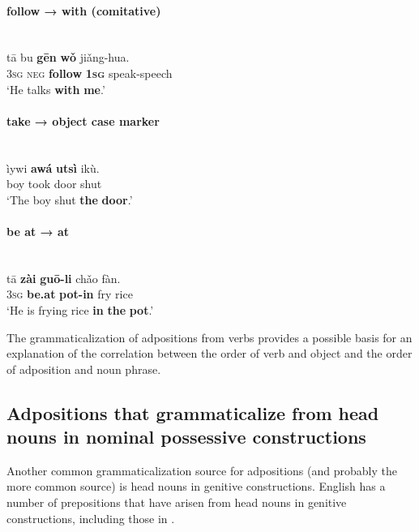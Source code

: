 \documentclass[output=paper]{langsci/langscibook}
\begin{document}
\paragraph*{follow → with (comitative)}

\ea\label{ex:dryer:5}
\\
\gll   tā  bu  \textbf{gēn}  \textbf{wǒ}  jiǎng-hua.\\
       3\textsc{sg}  \textsc{neg}  \textbf{follow}  \textbf{\textsc{1sg}}  speak-speech\\
\glt   ‘He talks \textbf{with} \textbf{me}.’
\z

\paragraph*{take → object case marker}

\ea\label{ex:dryer:6}
\\
\gll     ìywi  \textbf{awá}  \textbf{utsì}  ikù.\\
         boy  took  door  shut\\
\glt     ‘The boy shut \textbf{the} \textbf{door}.’
\z

\paragraph*{be at → at}

\ea\label{ex:dryer:7}
\\
\gll     tā  \textbf{zài}  \textbf{guō-li}  chǎo  fàn.\\
         3\textsc{sg}  \textbf{be.at}  \textbf{pot-in}  fry  rice\\
\glt     ‘He is frying rice \textbf{in} \textbf{the} \textbf{pot}.’
\z

The grammaticalization of adpositions from verbs provides a possible basis for an explanation of the correlation between the order of verb and object and the order of adposition and noun phrase.

\subsection{Adpositions that grammaticalize from head nouns in nominal possessive constructions}\label{sec:dryer:2.2}

Another common grammaticalization source for adpositions (and probably the more common source) is head nouns in genitive constructions. English has a number of prepositions that have arisen from head nouns in genitive constructions, including those in .
\end{document}
